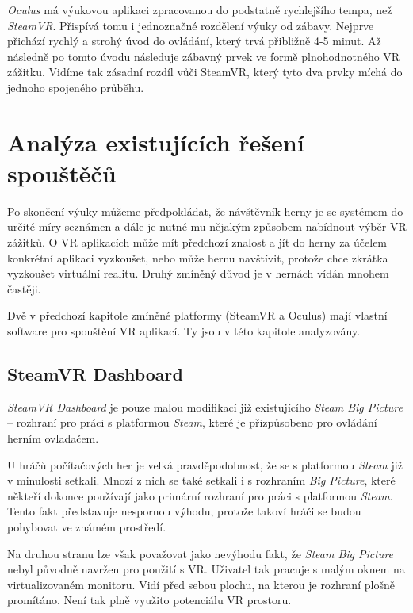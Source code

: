 \emph{Oculus} má výukovou aplikaci zpracovanou do podstatně rychlejšího
tempa, než \emph{SteamVR}. Přispívá tomu i jednoznačné rozdělení výuky
od zábavy. Nejprve přichází rychlý a strohý úvod do ovládání, který trvá
přibližně 4-5 minut. Až následně po tomto úvodu následuje zábavný prvek
ve formě plnohodnotného VR zážitku. Vidíme tak zásadní rozdíl vůči
SteamVR, který tyto dva prvky míchá do jednoho spojeného průběhu.

\section{Analýza existujících řešení
spouštěčů}\label{analuxfdza-existujuxedcuxedch-ux159eux161enuxed-spouux161tux11bux10dux16f}

Po skončení výuky můžeme předpokládat, že návštěvník herny je se
systémem do určité míry seznámen a dále je nutné mu nějakým způsobem
nabídnout výběr VR zážitků. O VR aplikacích může mít předchozí znalost a
jít do herny za účelem konkrétní aplikaci vyzkoušet, nebo může hernu
navštívit, protože chce zkrátka vyzkoušet virtuální realitu. Druhý
zmíněný důvod je v hernách vídán mnohem častěji.

Dvě v předchozí kapitole zmíněné platformy (SteamVR a Oculus) mají
vlastní software pro spouštění VR aplikací. Ty jsou v této kapitole
analyzovány.

\subsection{SteamVR Dashboard}\label{steamvr-dashboard}

\emph{SteamVR Dashboard} je pouze malou modifikací již existujícího
\emph{Steam Big Picture} -- rozhraní pro práci s platformou
\emph{Steam}, které je přizpůsobeno pro ovládání herním ovladačem.

U hráčů počítačových her je velká pravděpodobnost, že se s platformou
\emph{Steam} již v minulosti setkali. Mnozí z nich se také setkali i s
rozhraním \emph{Big Picture}, které někteří dokonce používají jako
primární rozhraní pro práci s platformou \emph{Steam}. Tento fakt
představuje nespornou výhodu, protože takoví hráči se budou pohybovat ve
známém prostředí.

Na druhou stranu lze však považovat jako nevýhodu fakt, že \emph{Steam
Big Picture} nebyl původně navržen pro použití s VR. Uživatel tak pracuje s
malým oknem na virtualizovaném monitoru. Vidí před sebou plochu, na
kterou je rozhraní plošně promítáno. Není tak plně využito potenciálu VR
prostoru.


